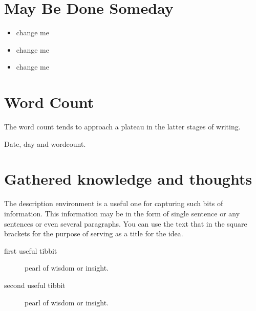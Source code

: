 \documentclass[10pt,letterpaper]{article}
\begin{document}
\section{May Be Done Someday}

\begin{itemize}
  \item change me
  \item change me
  \item change me
\end{itemize}


\section{Word Count}

The word count tends to approach a plateau in the latter stages of writing.

\begin{figure}[htp!]
  \centering
\end{figure}

\begin{table}[]
  \centering
  \caption{Date, day and wordcount.}
  \label{tab:my_label}
\end{table}

\section{Gathered knowledge and thoughts}

The description environment is a useful one for capturing such bits of information. This information may be in the form of single sentence or any sentences or even several paragraphs.
You can use the text that in the square brackets for the purpose of serving as a title for the idea.


\begin{description}
  \item [first useful tibbit] pearl of wisdom or insight.
  \item [second useful tibbit] pearl of wisdom or insight.
\end{description}
\end{document}
